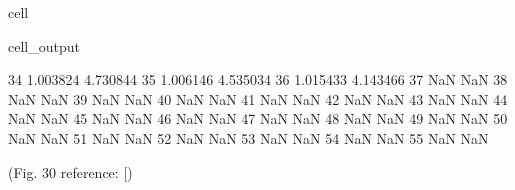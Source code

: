 \documentclass[letterpaper,10pt,english]{jupyterBook}
\begin{document}
\begin{sphinxuseclass}{cell}
\begin{sphinxVerbatimOutput}
\begin{sphinxuseclass}{cell_output}
\begin{sphinxVerbatim}[commandchars=\\\{\}]
					34                1.003824                    \PYGZhy{}4.730844  
					35                1.006146                    \PYGZhy{}4.535034  
					36                1.015433                    \PYGZhy{}4.143466  
					37                     NaN                          NaN  
					38                     NaN                          NaN  
					39                     NaN                          NaN  
					40                     NaN                          NaN  
					41                     NaN                          NaN  
					42                     NaN                          NaN  
					43                     NaN                          NaN  
					44                     NaN                          NaN  
					45                     NaN                          NaN  
					46                     NaN                          NaN  
					47                     NaN                          NaN  
					48                     NaN                          NaN  
					49                     NaN                          NaN  
					50                     NaN                          NaN  
					51                     NaN                          NaN  
					52                     NaN                          NaN  
					53                     NaN                          NaN  
					54                     NaN                          NaN  
					55                     NaN                          NaN  
				\end{sphinxVerbatim}
				
				\noindent{}
				
				\noindent{}
				
		\end{sphinxuseclass}\end{sphinxVerbatimOutput}
		
	\end{sphinxuseclass}
	\sphinxAtStartPar
	(Fig. 30 reference: {[}\sphinxhref{https://drive.google.com/file/d/142veTwOcleO7bb8oWHEaCu9fhHGYmhdf/view?usp=drive\_link}{Shrestha2013}{]})
	
\end{document}
